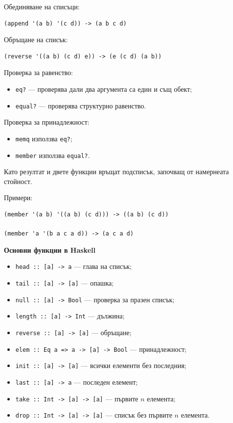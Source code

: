 \documentclass{article}
\renewcommand{\\}{\newline}
\begin{document}
Обединяване на списъци:
\begin{lstlisting}
(append '(a b) '(c d)) -> (a b c d)
\end{lstlisting}

Обръщане на списък:
\begin{lstlisting}
(reverse '((a b) (c d) e)) -> (e (c d) (a b))
\end{lstlisting}

Проверка за равенство:
\begin{itemize}
    \item \texttt{eq?} --- проверява дали два аргумента са един и същ обект;
    \item \texttt{equal?} --- проверява структурно равенство.
\end{itemize}

Проверка за принадлежност:
\begin{itemize}
    \item \texttt{memq} използва \texttt{eq?};
    \item \texttt{member} използва \texttt{equal?}.
\end{itemize}

Като резултат и двете функции връщат подсписък, започващ от намернеата стойност.

Примери:
\begin{lstlisting}
(member '(a b) '((a b) (c d))) -> ((a b) (c d))

(member 'a '(b a c a d)) -> (a c a d)
\end{lstlisting}

\textbf{Основни функции в Haskell}

\begin{itemize}
    \item \texttt{head :: [a] -> a} --- глава на списък;
    \item \texttt{tail :: [a] -> [a]} --- опашка;
    \item \texttt{null :: [a] -> Bool} --- проверка за празен списък;
    \item \texttt{length :: [a] -> Int} --- дължина;
    \item \texttt{reverse :: [a] -> [a]} --- обръщане;
    \item \texttt{elem :: Eq a => a -> [a] -> Bool} --- принадлежност;
    \item \texttt{init :: [a] -> [a]} --- всички елементи без последния;
    \item \texttt{last :: [a] -> a} --- последен елемент;
    \item \texttt{take :: Int -> [a] -> [a]} --- първите \(n\) елемента;
    \item \texttt{drop :: Int -> [a] -> [a]} --- списък без първите \(n\) елемента.
\end{itemize}
\end{document}
